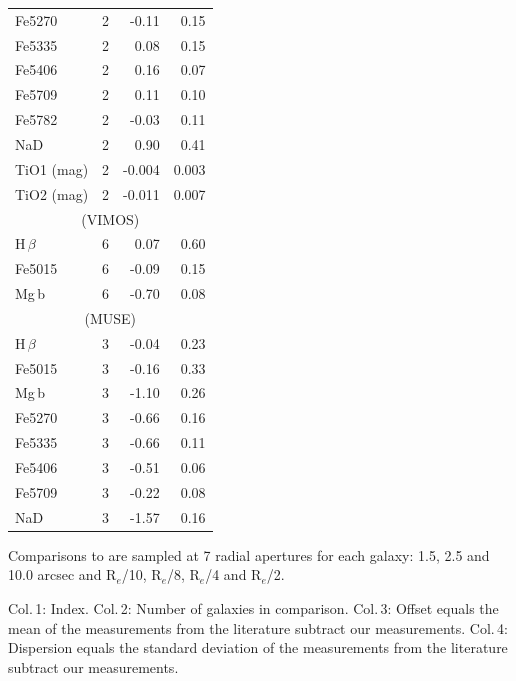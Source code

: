 \begin{table}
\begin{threeparttable}
\begin{tabular*}{0.8\textwidth}{@{\extracolsep{\fill}}l r r r}
					Fe5270 		& 2 		& -0.11\leavevmode\phantom{0}& 0.15\leavevmode\phantom{0}	\\
					Fe5335 		& 2 		& 0.08\leavevmode\phantom{0}& 0.15\leavevmode\phantom{0}	\\
					Fe5406 		& 2 		& 0.16\leavevmode\phantom{0}& 0.07\leavevmode\phantom{0}	\\
					Fe5709 		& 2 		& 0.11\leavevmode\phantom{0}& 0.10\leavevmode\phantom{0}	\\
					Fe5782 		& 2 		& -0.03\leavevmode\phantom{0}& 0.11\leavevmode\phantom{0}	\\
					NaD 		& 2 		& 0.90\leavevmode\phantom{0}& 0.41\leavevmode\phantom{0}	\\
					TiO1 (mag)	& 2 		& -0.004	& 0.003	\\
					TiO2 (mag)	& 2 		& -0.011	& 0.007	\\
					\hline
					\multicolumn{4}{c}{\citet{Ogando2008} (VIMOS)} \\
					\hline
					H\,$\beta$ 	& 6 		& 0.07\leavevmode\phantom{0}& 0.60\leavevmode\phantom{0}	\\
					Fe5015 		& 6 		& -0.09\leavevmode\phantom{0}& 0.15\leavevmode\phantom{0}	\\
					Mg\,b 		& 6 		& -0.70\leavevmode\phantom{0}& 0.08\leavevmode\phantom{0}	\\
					\hline
					\multicolumn{4}{c}{\citet{Ogando2008} (MUSE)} \\
					\hline
					H\,$\beta$ 	& 3 		& -0.04\leavevmode\phantom{0}& 0.23\leavevmode\phantom{0}	\\ 
					Fe5015 		& 3 		& -0.16\leavevmode\phantom{0}& 0.33\leavevmode\phantom{0}	\\ 
					Mg\,b 		& 3 		& -1.10\leavevmode\phantom{0}& 0.26\leavevmode\phantom{0}	\\
					Fe5270 		& 3 		& -0.66\leavevmode\phantom{0}& 0.16\leavevmode\phantom{0}	\\
					Fe5335 		& 3 		& -0.66\leavevmode\phantom{0}& 0.11\leavevmode\phantom{0}	\\
					Fe5406 		& 3 		& -0.51\leavevmode\phantom{0}& 0.06\leavevmode\phantom{0}	\\
					Fe5709 		& 3 		& -0.22\leavevmode\phantom{0}& 0.08\leavevmode\phantom{0}	\\
					NaD 		& 3 		& -1.57\leavevmode\phantom{0}& 0.16\leavevmode\phantom{0}	\\
					\hline
					\hline
				\end{tabular*}
				\begin{tablenotes}
				\footnotesize
				\note Comparisons to \citet{Rampazzo2005} are sampled at 7 radial apertures for each galaxy: 1.5, 2.5 and 10.0 arcsec and R$_e$/10, R$_e$/8, R$_e$/4 and R$_e$/2. 
				\item Col.\,1: Index. Col.\,2: Number of galaxies in comparison. Col.\,3: Offset equals the mean of the measurements from the literature subtract our measurements. Col.\,4: Dispersion equals the standard deviation of the measurements from the literature subtract our measurements.
				\end{tablenotes}
			\end{threeparttable}
			\end{table}
